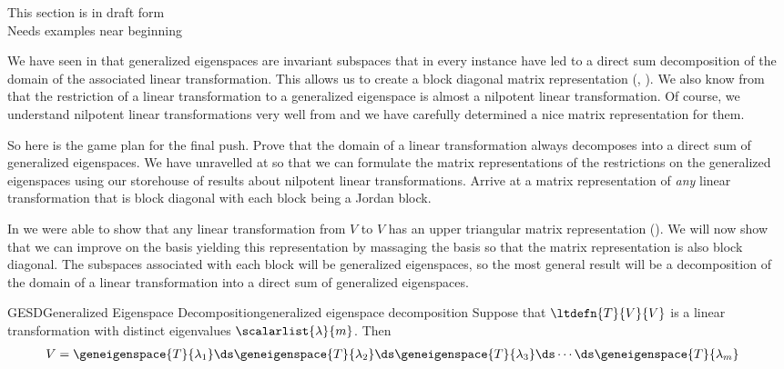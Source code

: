 %
{\sc\large This section is in draft form}\\
{\sc\large Needs examples near beginning}
\par\medskip
%
We have seen in  that generalized eigenspaces are invariant subspaces that in every instance have led to a direct sum decomposition of the domain of the associated linear transformation.  This allows us to create a block diagonal matrix representation (, ).     We also know from  that the restriction of a linear transformation to a generalized eigenspace is almost a nilpotent linear transformation.  Of course, we understand nilpotent linear transformations very well from  and we have carefully determined a nice matrix representation for them.\par
%
So here is the game plan for the final push.  Prove that the domain of a linear transformation always decomposes into a direct sum of generalized eigenspaces.  We have unravelled  at  so that we can formulate the matrix representations of the restrictions on the generalized eigenspaces using our storehouse of results about nilpotent linear transformations.  Arrive at a matrix representation of {\em any} linear transformation that is block diagonal with each block being a Jordan block.\par
%
%
In  we were able to show that any linear transformation from $V$ to $V$ has an upper triangular matrix representation ().  We will now show that we can improve on the basis yielding this representation by massaging the basis so that the matrix representation is also block diagonal.  The subspaces associated with each block will be generalized eigenspaces, so the most general result will be a decomposition of the domain of a linear transformation into a direct sum of generalized eigenspaces.
%
\begin{theorem}{GESD}{Generalized Eigenspace Decomposition}{generalized eigenspace decomposition}
Suppose that $\ltdefn{T}{V}{V}$ is a linear transformation with distinct eigenvalues $\scalarlist{\lambda}{m}$.  Then
%
\begin{align*}
V&=
\geneigenspace{T}{\lambda_1}\ds
\geneigenspace{T}{\lambda_2}\ds
\geneigenspace{T}{\lambda_3}\ds
\cdots\ds
\geneigenspace{T}{\lambda_m}
\end{align*}
%
\end{theorem}
